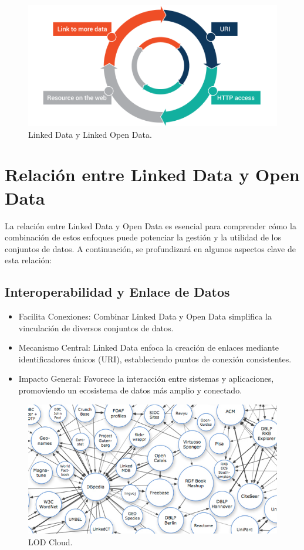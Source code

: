 \documentclass[11pt]{report}
\begin{document}
		\begin{figure}[H]
			\centering
			\includegraphics[scale=0.2]{../img/What-are-Linked-Data-and-Linked-Open-Data.png}
			\caption{Linked Data y Linked Open Data.}
			\label{fig:LOD}
		\end{figure}


	\chapter{Relación entre Linked Data y Open Data}

		La relación entre Linked Data y Open Data es esencial para comprender cómo la combinación de estos enfoques puede potenciar la gestión y la utilidad de los conjuntos de datos. A continuación, se profundizará en algunos aspectos clave de esta relación:
		
		\section{Interoperabilidad y Enlace de Datos}
		
\begin{itemize}
  \item Facilita Conexiones: Combinar Linked Data y Open Data simplifica la vinculación de diversos conjuntos de datos.
  \item Mecanismo Central: Linked Data enfoca la creación de enlaces mediante identificadores únicos (URI), estableciendo puntos de conexión consistentes.
  \item Impacto General: Favorece la interacción entre sistemas y aplicaciones, promoviendo un ecosistema de datos más amplio y conectado.
\end{itemize}

\begin{figure}[H]
	\centering
	\includegraphics[scale=0.4]{../img/lod.jpg}
	\caption{LOD Cloud.}
	\label{fig:lod}
\end{figure}
\end{document}
